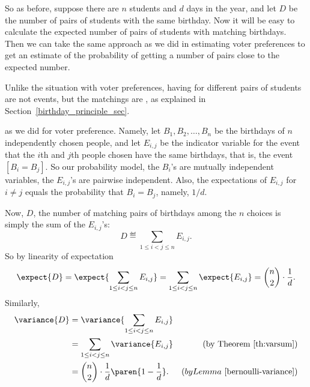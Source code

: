 So as before, suppose there are $n$ students and $d$ days in the year, and
let $D$ be the number of pairs of students with the same birthday.  Now it
will be easy to calculate the expected number of pairs of students with
matching birthdays.  Then we can take the same approach as we did in
estimating voter preferences to get an estimate of the probability of
getting a number of pairs close to the expected number.

Unlike the situation with voter preferences, having  for different pairs of students are not  events, but the matchings are \emph{}, as explained in
Section~\ref{birthday_principle_sec}.
%
\iffalse For example, knowing that Alice and Bob have matching
birthdays, and also that Ted and Alice have matching birthdays
obviously implies that Bob and Ted have matching birthdays.  On the
other hand, knowing that Alice and Bob have matching birthdays tells
us nothing about whether Alice and Carol have matching birthdays,
namely, these two events really are independent.  So even though the
events that various pairs of students have matching birthdays are not
mutually independent, indeed not even three-way independent, they are
\index{pairwise independent} \emph{pairwise} independent.  \fi
as we did for voter preference.  Namely, let $B_1,B_2,\dots,B_n$ be
the birthdays of $n$ independently chosen people, and let $E_{i,j}$ be
the indicator variable for the event that the $i$th and $j$th people
chosen have the same birthdays, that is, the event $[B_i = B_j]$.  So
our probability model, the $B_i$'s are mutually independent variables,
the $E_{i,j}$'s are pairwise independent.  Also, the expectations of
$E_{i,j}$ for $i \neq j$ equals the probability that $B_i = B_j$,
namely, $1/d$.

Now, $D$, the number of matching pairs of birthdays among the $n$
choices is simply the sum of the $E_{i,j}$'s:
\begin{equation}\label{Vn}
D \eqdef \sum_{1\le i < j \le n} E_{i,j}.
\end{equation}
So by linearity of expectation
\[
\expect{D} = \expect{\sum_{1\le i < j \le n} E_{i,j}} =
               \sum_{1\le i < j \le n} \expect{E_{i,j}} =
               \binom{n}{2}\cdot \frac{1}{d}.
\]
Similarly,
\begin{align*}
\variance{D}
   & = \variance{\sum_{1\le i < j \le n} E_{i,j}}\\
   & = \sum_{1\le i < j \le n} \variance{E_{i,j}}
           & \text{(by Theorem~\ref{th:varsum})}\\
   & = \binom{n}{2} \cdot \frac{1}{d}\paren{1-\frac{1}{d}}.
           & (by Lemma~\ref{bernoulli-variance})
\end{align*}

